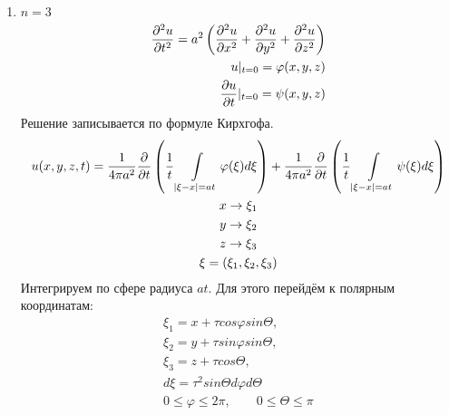 \documentclass[../main.tex]{subfiles}
\begin{document}
\begin{enumerate}
\item $n=3$
\begin{equation}
    \label{eq:2.7.2}
    \begin{split}
    \frac{\partial ^2u}{\partial t^2} = a^2\left(\frac{\partial ^2u}{\partial x^2}+\frac{\partial ^2u}{\partial y^2}+\frac{\partial ^2u}{\partial z^2}\right)\\
    u|_{t=0} = \varphi(x,y,z)\\
    \frac{\partial u}{\partial t}|_{t=0} = \psi(x,y,z)
    \end{split}
\end{equation}
Решение записывается по формуле Кирхгофа.
\begin{gather*}
    u(x,y,z,t) = \frac{1}{4\pi a^2}\frac{\partial  }{\partial t}\left(
    \frac{1}{t}\int\displaylimits_{|\xi-x|=at} \varphi(\xi)d\xi\right)
    +
    \frac{1}{4\pi a^2}\frac{\partial  }{\partial t}\left(
    \frac{1}{t}\int\displaylimits_{|\xi-x|=at} \psi(\xi)d\xi\right)\\
    x \rightarrow \xi_1\\
    y \rightarrow \xi_2\\
    z \rightarrow \xi_3\\
    \xi = (\xi_1,\xi_2, \xi_3)
\end{gather*}
Интегрируем по сфере радиуса $at$. Для этого перейдём к
полярным координатам:
\begin{gather*}
    \xi_1 = x + \tau cos\varphi sin\varTheta, \\
    \xi_2 = y + \tau sin\varphi sin\varTheta,\\
    \xi_3 = z + \tau cos\varTheta,\\
    d\xi = \tau^2 sin\varTheta d\varphi d\varTheta \\
    0 \leq \varphi \leq 2\pi, \qquad 0 \leq \varTheta \leq \pi
\end{gather*}
\end{enumerate}
\end{document}
